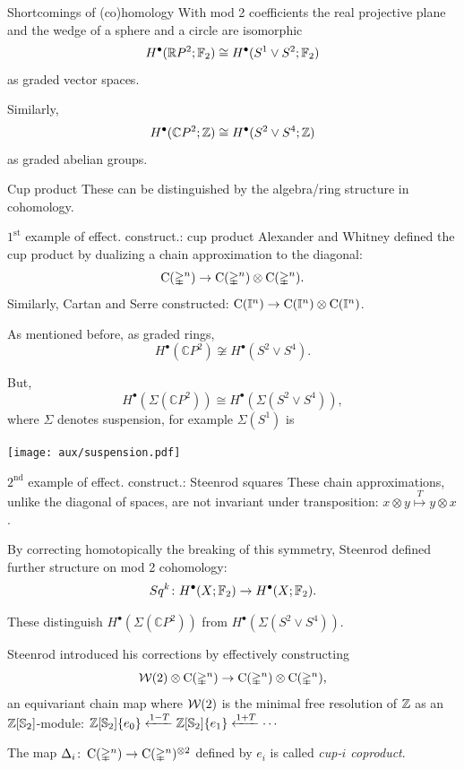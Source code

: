 \documentclass[10pt,t]{beamer} %
\begin{document}
\begin{frame}{Shortcomings of (co)homology}
	\pause With mod 2 coefficients the real projective plane and the wedge of a sphere and a circle are isomorphic
	\[
	H^\bullet(\mathbb{R} P^2; {\mathbb{F}_2}) \cong H^\bullet(S^1 \vee S^2; {\mathbb{F}_2})
	\]
	as graded vector spaces.

	\bigskip \pause
	Similarly,
	\[
	H^\bullet(\mathbb{C} P^2; \mathbb{Z}) \cong H^\bullet(S^2 \vee S^4; \mathbb{Z})
	\]
	as graded abelian groups.

	\bigskip \pause
	\begin{block}{Cup product}
		These can be distinguished by the algebra/ring structure in cohomology.
	\end{block}
\end{frame}

\begin{frame}[fragile]{$1^{\mathrm{st}}$ example of effect. construct.: cup product}
	\pause Alexander and Whitney defined the cup product by dualizing a chain approximation to the diagonal:
	\[
	\operatorname{C}(\mathbb{\Delta}^n) \to \operatorname{C}(\mathbb{\Delta}^n) \otimes \operatorname{C}(\mathbb{\Delta}^n).
	\]
	\pause Similarly, Cartan and Serre constructed: $\operatorname{C}(\mathbb{I}^n) \to \operatorname{C}(\mathbb{I}^n) \otimes \operatorname{C}(\mathbb{I}^n)$.

	\bigskip \pause
	As mentioned before, as graded rings,
	\[
	H^\bullet(\mathbb{C} P^2) \not\cong H^\bullet(S^2 \vee S^4).
	\]

	\vskip -8pt \pause But,
	\[
	H^\bullet(\Sigma(\mathbb{C} P^2)) \cong H^\bullet(\Sigma(S^2 \vee S^4)),
	\]
	where $\Sigma$ denotes suspension, for example $\Sigma(S^1)$ is
	\begin{center}
		\texttt{[image: aux/suspension.pdf]}
	\end{center}
\end{frame}

\begin{frame}{$2^{\mathrm{nd}}$ example of effect. construct.: Steenrod squares}
	\pause These chain approximations, unlike the diagonal of spaces, are \textcolor{pblue}{not} invariant under transposition: $x \otimes y \stackrel{T}{\mapsto} y \otimes x$.

	\medskip \pause By correcting homotopically the breaking of this symmetry, Steenrod defined further structure on mod 2 cohomology:
	\[
	Sq^k \colon H^\bullet(X; {\mathbb{F}_2}) \to H^\bullet(X; {\mathbb{F}_2}).
	\]

	\pause These \textcolor{pblue}{distinguish} $H^\bullet(\Sigma(\mathbb{C} P^2))$ from $H^\bullet(\Sigma(S^2 \vee S^4))$.

	\medskip \pause Steenrod introduced his corrections by effectively constructing
	\[
	\mathcal{W}(2) \otimes \operatorname{C}(\mathbb{\Delta}^n) \to \operatorname{C}(\mathbb{\Delta}^n) \otimes \operatorname{C}(\mathbb{\Delta}^n),
	\]
	an equivariant chain map where $\mathcal{W}(2)$ is the minimal free resolution of $\mathbb{Z}$ as an $\mathbb{Z}[\mathbb{S}_2]$-module: $\mathbb{Z}[\mathbb{S}_2]\{e_0\} \xleftarrow{1-T} \mathbb{Z}[\mathbb{S}_2]\{e_1\} \xleftarrow{1+T} \dotsb$

	\bigskip \pause The map $\Delta_i \colon \operatorname{C}(\mathbb{\Delta}^n) \to \operatorname{C}(\mathbb{\Delta}^n)^{\otimes 2}$ defined by $e_i$ is called \textit{cup-$i$ coproduct}.
\end{frame}
\end{document}
